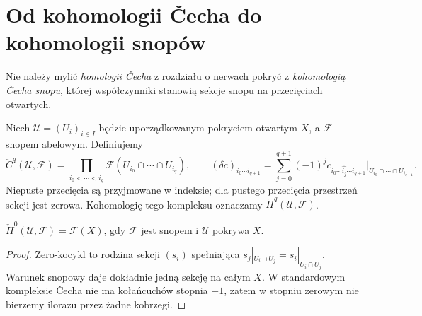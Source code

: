 \section{Od kohomologii \v{C}echa do kohomologii snopów}
\label{sec:cech-sheaves-v12}
Nie należy mylić \emph{homologii \v{C}echa} z rozdziału o
nerwach pokryć z \emph{kohomologią \v{C}echa snopu}, której
współczynniki stanowią sekcje snopu na przecięciach otwartych.

\begin{definicja}
Niech $\mathcal U=(U_i)_{i\in I}$ będzie uporządkowanym pokryciem
otwartym $X$, a $\mathcal F$ snopem abelowym. Definiujemy
\[
\check C^q(\mathcal U,\mathcal F)
=\prod_{i_0<\cdots<i_q}\mathcal F(U_{i_0}\cap\cdots\cap U_{i_q}),
\qquad
(\delta c)_{i_0\cdots i_{q+1}}
=\sum_{j=0}^{q+1}(-1)^j
c_{i_0\cdots\widehat{i_j}\cdots i_{q+1}}
\big|_{U_{i_0}\cap\cdots\cap U_{i_{q+1}}}.
\]
Niepuste przecięcia są przyjmowane w indeksie; dla pustego
przecięcia przestrzeń sekcji jest zerowa. Kohomologię tego
kompleksu oznaczamy $\check H^q(\mathcal U,\mathcal F)$.
\end{definicja}

\begin{stwierdzenie}
$\check H^0(\mathcal U,\mathcal F)=\mathcal F(X)$,
gdy $\mathcal F$ jest snopem i $\mathcal U$ pokrywa $X$.
\end{stwierdzenie}
\begin{proof}
Zero-kocykl to rodzina sekcji $(s_i)$ spełniająca
$s_j|_{U_i\cap U_j}=s_i|_{U_i\cap U_j}$.
Warunek snopowy daje dokładnie jedną sekcję na całym $X$.
W standardowym kompleksie \v{C}echa nie ma kołańcuchów stopnia $-1$,
zatem w stopniu zerowym nie bierzemy ilorazu przez żadne kobrzegi.
\end{proof}

